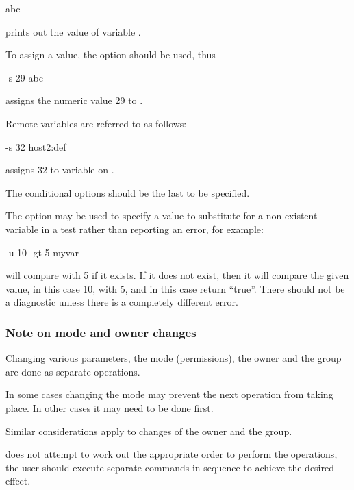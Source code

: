 \begin{expara}

\BtvarName{} abc

\end{expara}

prints out the value of variable .

To assign a value, the  option should be used, thus

\begin{expara}

\BtvarName{} -s 29 abc

\end{expara}

assigns the numeric value 29 to .

Remote variables are referred to as follows:

\begin{expara}

\BtvarName{} -s 32 host2:def

\end{expara}

assigns 32 to variable  on .

The conditional options should be the last to be specified.

The  option may be used to specify a value to substitute for a non-existent variable in a test rather than reporting
an error, for example:

\begin{expara}

\BtvarName{} -u 10 -gt 5 myvar

\end{expara}

will compare  with 5 if it exists. If it does not exist, then it will compare the given value, in this case 10,
with 5, and in this case return ``true''. There should not be a diagnostic unless there is a completely different error.

\subsubsection{Note on mode and owner changes}
Changing various parameters, the mode (permissions), the owner and the group are done as separate operations.

In some cases changing the mode may prevent the next operation from taking place. In other cases it may need to be done first.

Similar considerations apply to changes of the owner and the group.

\PrBtvar{} does not attempt to work out the appropriate order to perform the operations, the user should execute
separate \PrBtvar{} commands in sequence to achieve the desired effect.

